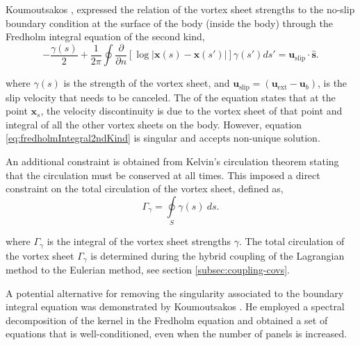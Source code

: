 Koumoutsakos \cite{Koumoutsakos1993b}, expressed the relation of the vortex sheet strengths to the no-slip boundary condition at the surface of the body (inside the body) through the Fredholm integral equation of the second kind,
	\begin{equation}
	-\frac{\gamma\left(s\right)}{2} + \frac{1}{2\pi}\oint\frac{\partial}{\partial n}\left[\log\left|\mathbf{x}\left(s\right)-\mathbf{x}\left(s'\right)\right|\right]\gamma\left(s'\right)ds'= \mathbf{u}_{\mathrm{slip}}\cdot\mathbf{\hat{s}}.
	\label{eq:fredholmIntegral2ndKind}
	\end{equation}

where $\gamma(s)$ is the strength of the vortex sheet, and $\mathbf{u}_{\mathrm{slip}} = (\mathbf{u}_{\mathrm{ext}}-\mathbf{u}_{b})$, is the slip velocity that needs to be canceled. The  of the equation states that at the point $\mathbf{x}_s$, the velocity discontinuity is due to the vortex sheet of that point and integral of all the other vortex sheets on the body. However, equation \ref{eq:fredholmIntegral2ndKind} is singular and accepts non-unique solution. 

An additional constraint is obtained from Kelvin's circulation theorem stating that the circulation must be conserved at all times. This imposed a direct constraint on the total circulation of the vortex sheet, defined as,
	\begin{equation}
	\Gamma_{\gamma} = \oint\limits_S\gamma\left(s\right)\ d s.
	\label{eq:circulationConstraintonPanels}
	\end{equation}

where $\Gamma_{\gamma}$ is the integral of the vortex sheet strengths $\gamma$. The total circulation of the vortex sheet $\Gamma_{\gamma}$ is determined during the hybrid coupling of the Lagrangian method to the Eulerian method, see section \ref{subsec:coupling-covs}.

A potential alternative for removing the singularity associated to the boundary integral equation was demonstrated by Koumoutsakos \cite{Koumoutsakos1993a}. He employed a spectral decomposition of the kernel in the Fredholm equation and obtained a set of equations that is well-conditioned, even when the number of panels is increased.

